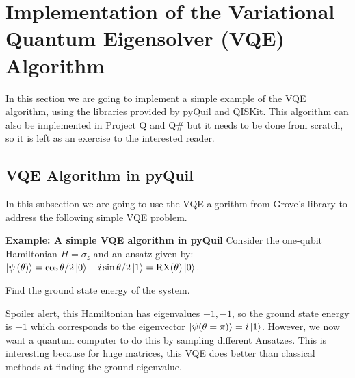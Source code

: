 \section{Implementation of the Variational Quantum Eigensolver (VQE) Algorithm}

In this section we are going to implement a simple example of the VQE algorithm, using the libraries provided by pyQuil and QISKit. This algorithm can also be implemented in Project Q and Q\# but it needs to be done from scratch, so it is left as an exercise to the interested reader.

\subsection{VQE Algorithm in pyQuil}

In this subsection we are going to use the VQE algorithm from Grove's library to address the following simple VQE problem.

\begin{tcolorbox}[standard jigsaw,
    opacityback=0,  %
    boxrule=0.5pt,label={example0000001}]
    {\bf Example: A simple VQE algorithm in pyQuil}
    \tcbline
    Consider the one-qubit Hamiltonian $H=\sigma_z$  and an ansatz given by:
    $\left\vert{\psi\left(\theta\right)}\right\rangle=\cos{\theta/2}\left\vert{0}\right\rangle-i\sin{\theta/2}\left\vert{1}\right\rangle={\rm RX}(\theta)\left\vert{0}\right\rangle$.
    \begin{comment}
    \begin{align*}
    H=\sigma_z,
    \end{align*}
    and an ansatz given by:
    \begin{align*}
    \ket{\psi\left(\theta\right)}=\cos{\theta/2}\ket{0}-i\sin{\theta/2}\ket{1}={\rm RX}(\theta)\ket{0}.
    \end{align*}
    \end{comment}
    Find the ground state energy of the system.
\end{tcolorbox}

Spoiler alert, this Hamiltonian has eigenvalues $+1,-1$, so the ground state energy is $-1$ which corresponds to the eigenvector $\left\vert{\psi(\theta=\pi)}\right\rangle=i\left\vert{1}\right\rangle$. However, we now want a quantum computer to do this by sampling different Ansatzes. This is interesting because for huge matrices, this VQE does better than classical methods at finding the ground eigenvalue.

